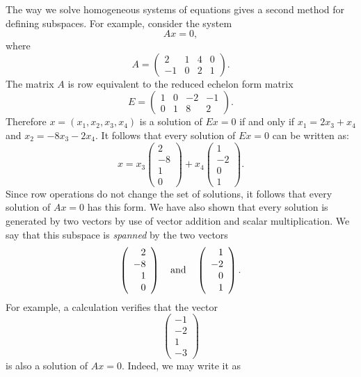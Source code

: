 \documentclass{ximera}
\begin{document}
The way we solve homogeneous systems of equations gives a second
method for defining subspaces.  For example, consider the system
\[
Ax=0,
\]
where
\[
A=\left(\begin{array}{rccc} 2 & 1 & 4 & 0 \\ -1 & 0 & 2 & 1
        \end{array}\right).
\]
The matrix $A$ is row equivalent to the reduced echelon form matrix
\[
E=\left(\begin{array}{ccrr} 1 & 0 & -2 & -1 \\ 0 & 1 & 8 & 2
        \end{array}\right).
\]
Therefore $x=(x_1,x_2,x_3,x_4)$ is a solution of $Ex=0$ if and
only if $x_1 = 2x_3+x_4$ and $x_2 = -8x_3 - 2x_4$.
It follows that every solution of $Ex=0$ can be written as:
\[
x = x_3\left(\begin{array}{r} 2 \\ -8\\ 1\\ 0 \end{array}\right)
+x_4\left(\begin{array}{r} 1 \\ -2\\ 0\\ 1 \end{array}\right).
\]
Since row operations do not change the set of solutions, it
follows that every solution of $Ax=0$ has this form. We have
also shown that every solution is generated by two vectors by
use of vector addition and
scalar multiplication.  We say that
this subspace is {\em spanned\/} by the two vectors
\[
\left(\begin{array}{r} 2 \\ -8\\ 1\\ 0 \end{array}\right)
\quad\mbox{and}\quad
\left(\begin{array}{r} 1 \\ -2\\ 0\\ 1 \end{array}\right).
\]
For example, a calculation verifies that the vector
\[
\left(\begin{array}{r} -1 \\ -2\\ 1\\ -3 \end{array}\right)
\]
is also a solution of $Ax=0$.  Indeed, we may write it as
\end{document}
